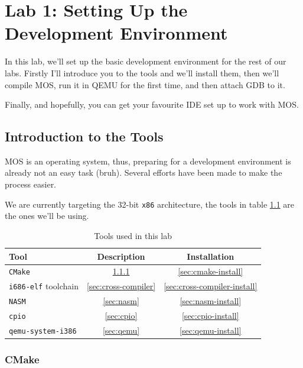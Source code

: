 \chapter{Lab 1: Setting Up the Development Environment}

In this lab, we'll set up the basic development environment for the rest of our labs. Firstly
I'll introduce you to the tools and we'll install them, then we'll compile MOS, run it in QEMU
for the first time, and then attach GDB to it.

Finally, and hopefully, you can get your favourite IDE set up to work with MOS.

\section{Introduction to the Tools}

MOS is an operating system, thus, preparing for a development environment is already not
an easy task (bruh). Several efforts have been made to make the process easier.

We are currently targeting the 32-bit \texttt{x86} architecture, the tools in table \ref{tab:tools}
are the ones we'll be using.

\begin{table}[h!]
    \centering
    \begin{tabular}{|l|c|c|}
        \hline \textbf{Tool}               & \textbf{Description}     & \textbf{Installation}            \\
        \hline \texttt{CMake}              & \ref{sec:cmake}          & \ref{sec:cmake-install}          \\
        \hline \texttt{i686-elf} toolchain & \ref{sec:cross-compiler} & \ref{sec:cross-compiler-install} \\
        \hline \texttt{NASM}               & \ref{sec:nasm}           & \ref{sec:nasm-install}           \\
        \hline \texttt{cpio}               & \ref{sec:cpio}           & \ref{sec:cpio-install}           \\
        \hline \texttt{qemu-system-i386}   & \ref{sec:qemu}           & \ref{sec:qemu-install}           \\
        \hline
    \end{tabular}
    \caption{Tools used in this lab}
    \label{tab:tools}
\end{table}

\subsection{CMake} \label{sec:cmake}

